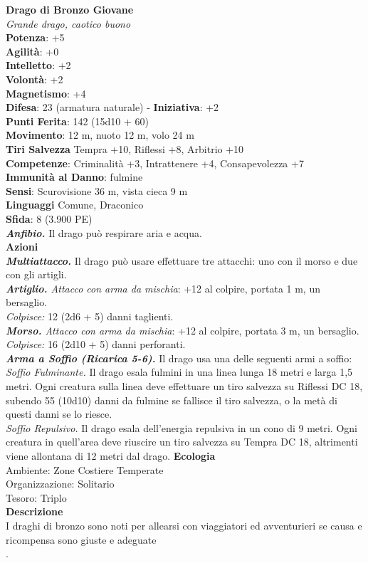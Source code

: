 \begin{multicols}{2}
\medskip\textbf{Drago di Bronzo Giovane}\\
\emph{Grande drago, caotico buono}\\
\textbf{Potenza}: +5\\
\textbf{Agilità}: +0\\
\textbf{Intelletto}: +2\\
\textbf{Volontà}: +2\\
\textbf{Magnetismo}: +4\\
\textbf{Difesa}: 23 (armatura naturale) - \textbf{Iniziativa}: +2\\
\textbf{Punti Ferita}: 142 (15d10 + 60)\\
\textbf{Movimento}: 12 m, nuoto 12 m, volo 24 m\\
\textbf{Tiri Salvezza} Tempra +10, Riflessi +8, Arbitrio +10\\
\textbf{Competenze}: Criminalità +3, Intrattenere +4, Consapevolezza +7\\
\textbf{Immunità al Danno}: fulmine\\
\textbf{Sensi}: Scurovisione 36 m, vista cieca 9 m\\
\textbf{Linguaggi} Comune, Draconico\\
\textbf{Sfida}: 8 (3.900 PE)\smallskip\\
\emph{\textbf{Anfibio.}} Il drago può respirare aria e acqua.\\
\smallskip\textbf{Azioni}\\
\emph{\textbf{Multiattacco.}} Il drago può usare effettuare tre attacchi: uno con il morso e due con gli artigli.\\
\emph{\textbf{Artiglio.} Attacco con arma da mischia}: +12 al colpire, portata 1 m, un bersaglio.\\
\emph{Colpisce:} 12 (2d6 + 5) danni taglienti.\\
\emph{\textbf{Morso.} Attacco con arma da mischia}: +12 al colpire, portata 3 m, un bersaglio.\\
\emph{Colpisce:} 16 (2d10 + 5) danni perforanti.\\
\emph{\textbf{Arma a Soffio (Ricarica 5-6).}} Il drago usa una delle seguenti armi a soffio:\\
\emph{Soffio Fulminante.} Il drago esala fulmini in una linea lunga 18 metri e larga 1,5 metri. Ogni creatura sulla linea deve effettuare un tiro salvezza su Riflessi DC  18, subendo 55 (10d10) danni da fulmine se fallisce il tiro salvezza, o la metà di questi danni se lo riesce.\\
\emph{Soffio Repulsivo.} Il drago esala dell'energia repulsiva in un cono di 9 metri. Ogni creatura in quell'area deve riuscire un tiro salvezza su Tempra DC  18, altrimenti viene allontana di 12 metri dal drago.
\textbf{Ecologia}\\
Ambiente: Zone Costiere Temperate\\
Organizzazione: Solitario\\
Tesoro: Triplo\\
\textbf{Descrizione}\\
I draghi di bronzo sono noti per allearsi con viaggiatori ed avventurieri se causa e ricompensa sono giuste e adeguate\\
.


\end{multicols}
